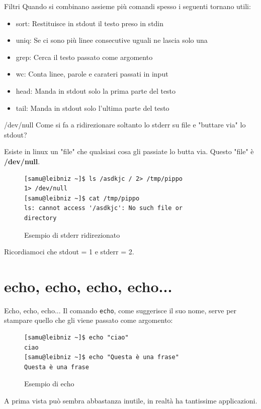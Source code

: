 \documentclass{beamer}
\begin{document}
\begin{frame}{Filtri}
  Quando si combinano assieme più comandi spesso i seguenti tornano utili:
  \begin{itemize}
    \item<1-> sort: Restituisce in stdout il testo preso in stdin
    \item<2-> uniq: Se ci sono più linee consecutive uguali ne lascia solo una
    \item<3-> grep: Cerca il testo passato come argomento
    \item<4-> wc: Conta linee, parole e carateri passati in input
    \item<5-> head: Manda in stdout solo la prima parte del testo
    \item<6-> tail: Manda in stdout solo l'ultima parte del testo
  \end{itemize}
\end{frame}

\begin{frame}[fragile]{/dev/null}
  Come si fa a ridirezionare soltanto lo stderr su file e "buttare via" lo
  stdout? \medskip
  \pause

  Esiste in linux un "file" che qualsiasi cosa gli passiate lo butta via. Questo
  "file" è \textbf{/dev/null}.\medskip

  \begin{figure}
    \begin{lstlisting}
[samu@leibniz ~]$ ls /asdkjc / 2> /tmp/pippo 
1> /dev/null
[samu@leibniz ~]$ cat /tmp/pippo
ls: cannot access '/asdkjc': No such file or 
directory
    \end{lstlisting}
    \caption{Esempio di stderr ridirezionato}
  \end{figure}

Ricordiamoci che stdout = 1 e stderr = 2.
\end{frame}

\section{\Large echo, \small echo, \tiny echo, echo...}
\begin{frame}[fragile]{Echo, \small echo, \tiny echo...}
  Il comando \texttt{echo}, come suggerisce il suo nome, serve per stampare
  quello che gli viene passato come argomento:

  \begin{figure}
    \begin{lstlisting}
[samu@leibniz ~]$ echo "ciao"
ciao
[samu@leibniz ~]$ echo "Questa è una frase"
Questa è una frase
    \end{lstlisting}
    \caption{Esempio di echo}
  \end{figure}
  A prima vista può sembra abbastanza inutile, in realtà ha tantissime
  applicazioni.
\end{frame}
\end{document}
